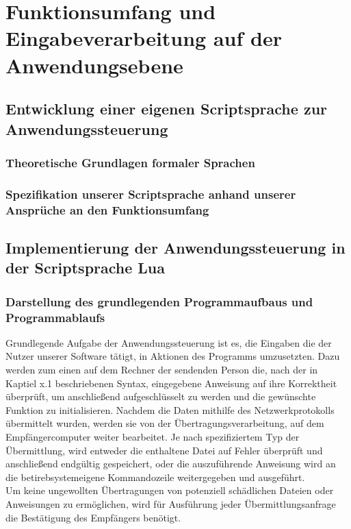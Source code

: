 \documentclass[12pt, a4paper]{scrartcl}
\begin{document}
\section{Funktionsumfang und Eingabeverarbeitung auf der Anwendungsebene}

\subsection{Entwicklung einer eigenen Scriptsprache zur Anwendungssteuerung}
\subsubsection{Theoretische Grundlagen formaler Sprachen}
\subsubsection{Spezifikation unserer Scriptsprache anhand unserer Ansprüche an den Funktionsumfang}

\subsection{Implementierung der Anwendungssteuerung in der Scriptsprache Lua}

\subsubsection{Darstellung des grundlegenden Programmaufbaus und Programmablaufs}
Grundlegende Aufgabe der Anwendungssteuerung ist es, die Eingaben die der Nutzer unserer Software tätigt, in Aktionen des Programms umzusetzten. Dazu werden zum einen auf dem Rechner der sendenden Person die, nach der in Kaptiel x.1 beschriebenen Syntax, eingegebene Anweisung auf ihre Korrektheit überprüft, um anschließend aufgeschlüsselt zu werden und die gewünschte Funktion zu initialisieren. Nachdem die Daten mithilfe des Netzwerkprotokolls übermittelt wurden, werden sie von der Übertragungsverarbeitung, auf dem Empfängercomputer weiter bearbeitet. Je nach spezifiziertem Typ der Übermittlung, wird entweder die enthaltene Datei auf Fehler überprüft und anschließend endgültig gespeichert, oder die auszuführende Anweisung wird an die betirebsystemeigene Kommandozeile weitergegeben und ausgeführt.\\
Um keine ungewollten Übertragungen von potenziell schädlichen Dateien oder Anweisungen zu ermöglichen, wird für Ausführung jeder Übermittlungsanfrage die Bestätigung des Empfängers benötigt.  
\end{document}
